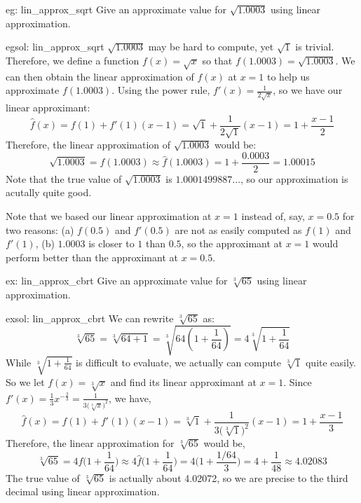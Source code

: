 \begin{eg}[]{eg: lin_approx_sqrt}
    Give an approximate value for $\sqrt{1.0003}$ using linear approximation.
\end{eg}

\begin{egsol}[]{egsol: lin_approx_sqrt}
    $\sqrt{1.0003}$ may be hard to compute, yet $\sqrt{1}$ is trivial.  Therefore, we define a function $f(x) = \sqrt{x}$ so that $f(1.0003) = \sqrt{1.0003}$.  We can then obtain the linear approximation of $f(x)$ at $x=1$ to help us approximate $f(1.0003)$.  Using the power rule, $f'(x) = \frac{1}{2\sqrt{x}}$, so we have our linear approximant:
    \[\hat{f}(x) = f(1) + f'(1)(x-1) = \sqrt{1} + \frac{1}{2\sqrt{1}}(x-1) = 1+\frac{x-1}{2}\]
    Therefore, the linear approximation of $\sqrt{1.0003}$ would be:
    \[\sqrt{1.0003} = f(1.0003) \approx \hat{f}(1.0003) = 1+\frac{0.0003}{2} = 1.00015\]
    Note that the true value of $\sqrt{1.0003}$ is $1.0001499887...$, so our approximation is acutally quite good.
\end{egsol}

\begin{remark}
    Note that we based our linear approximation at $x=1$ instead of, say, $x=0.5$ for two reasons: (a) $f(0.5)$ and $f'(0.5)$ are not as easily computed as $f(1)$ and $f'(1)$, (b) $1.0003$ is closer to $1$ than $0.5$, so the approximant at $x=1$ would perform better than the approximant at $x=0.5$.
\end{remark}

\begin{ex}[]{ex: lin_approx_cbrt}
Give an approximate value for $\sqrt[3]{65}$ using linear approximation.
\end{ex}

\begin{exsol}[]{exsol: lin_approx_cbrt}
We can rewrite $\sqrt[3]{65}$ as:
\[\sqrt[3]{65} = \sqrt[3]{64 + 1} = \sqrt[3]{64\left(1+\frac{1}{64}\right)}= 4\sqrt[3]{1+\frac{1}{64}}\]
While $\sqrt[3]{1+\frac{1}{64}}$ is difficult to evaluate, we actually can compute $\sqrt[3]{1}$ quite easily.  So we let $f(x) = \sqrt[3]{x}$ and find its linear approximant at $x=1$. Since $f'(x) = \frac{1}{3}x^{-\frac{2}{3}} = \frac{1}{3\big(\sqrt[3]{x}\big)^2}$, we have,
\[\hat{f}(x) = f(1) + f'(1)(x-1) = \sqrt[3]{1} + \frac{1}{3\big(\sqrt[3]{1}\big)^2}(x-1) = 1+\frac{x-1}{3}\]
Therefore, the linear approximation for $\sqrt[3]{65}$ would be,
\[\sqrt[3]{65} = 4f\Big(1+\frac{1}{64}\Big) \approx 4\hat{f}\Big(1+\frac{1}{64}\Big) = 4\Big(1+\frac{1/64}{3}\Big) = 4+\frac{1}{48} \approx 4.02083\]
The true value of $\sqrt[3]{65}$ is actually about 4.02072, so we are precise to the third decimal using linear approximation.
\end{exsol}

